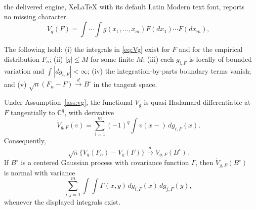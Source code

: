 \documentclass[10pt,a4paper]{amsart}
\newcommand{\dto}{\xrightarrow{d}}
\begin{document}
the delivered engine, XeLaTeX with its default Latin Modern text font, reports no missing character.
\begin{equation}\label{eq:Vg}
V_g(F)=\int\cdots\int g(x_1,\ldots,x_m)F(dx_1)\cdots F(dx_m),
\end{equation}

\begin{assumption}\label{ass:vg}
The following hold: (i) the integrals in \eqref{eq:Vg} exist for \(F\) and for the empirical distribution \(F_n\); (ii) \(|g|\le M\) for some finite \(M\); (iii) each \(g_{i,F}\) is locally of bounded variation and \(\int |dg_{i,F}|<\infty\); (iv) the integration-by-parts boundary terms vanish; and (v) \(\sqrt n(F_n-F)\dto B^\circ\) in the tangent space.
\end{assumption}

\begin{proposition}\label{prop:vg_derivative}
Under Assumption~\ref{ass:vg}, the functional \(V_g\) is quasi-Hadamard differentiable at \(F\) tangentially to \(\mathbb C^q\), with derivative
\begin{equation}\label{eq:vg_derivative}
\dot V_{g,F}(v)=\sum_{i=1}^m(-1)^q\int v(x-)\,dg_{i,F}(x).
\end{equation}
Consequently,
\[
\sqrt n\{V_g(F_n)-V_g(F)\}\dto \dot V_{g,F}(B^\circ).
\]
If \(B^\circ\) is a centered Gaussian process with covariance function \(\Gamma\), then \(\dot V_{g,F}(B^\circ)\) is normal with variance
\[
\sum_{i,j=1}^m\int\int \Gamma(x,y)\,dg_{i,F}(x)\,dg_{j,F}(y),
\]
whenever the displayed integrals exist.
\end{proposition}
\end{document}
